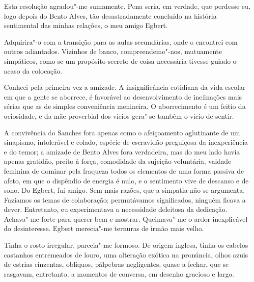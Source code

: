 Esta resolução
agradou"-me sumamente. Pena seria, em verdade, que perdesse eu, logo
depois do Bento Alves, tão desastradamente concluído na história
sentimental das minhas relações, o meu amigo Egbert. 

Adquirira"-o com a transição para as aulas secundárias, onde o encontrei com outros
adiantados. Vizinhos de banco, compreendemo"-nos, mutuamente
simpáticos, como se um propósito secreto de coisa necessária tivesse
guiado o acaso da colocação. 

Conheci pela primeira vez a amizade. A
insignificância cotidiana da vida escolar em que a gente se aborrece, é
favorável ao desenvolvimento de inclinações mais sérias que as de
simples conveniência menineira. O aborrecimento é um feitio da
ociosidade, e da mãe proverbial dos vícios gera"-se também o vício de
sentir. 

A convivência do Sanches fora apenas como o afeiçoamento
aglutinante de um sinapismo, intolerável e colado, espécie de
escravidão preguiçosa da inexperiência e do temor; a amizade de Bento
Alves fora verdadeira, mas do meu lado havia apenas gratidão, preito à
força, comodidade da sujeição voluntária, vaidade feminina de dominar
pela fraqueza todos os elementos de uma forma passiva de afeto, em que
o dispêndio de energia é nulo, e o sentimento vive de descanso e de
sono. Do Egbert, fui amigo. Sem mais razões, que a simpatia não se
argumenta. Fazíamos os temas de colaboração; permutávamos significados,
ninguém ficava a dever. Entretanto, eu experimentava a necessidade
deleitosa da dedicação. Achava"-me forte para querer bem e mostrar.
Queimava"-me o ardor inexplicável do desinteresse. Egbert merecia"-me
ternuras de irmão mais velho. 

Tinha o rosto irregular, parecia"-me
formoso. De origem inglesa, tinha os cabelos castanhos
entremeados de louro, uma alteração exótica na pronúncia, olhos azuis de
estrias cinzentas, oblíquos, pálpebras negligentes, quase a fechar, que
se rasgavam, entretanto, a momentos de conversa, em desenho gracioso e
largo. 


